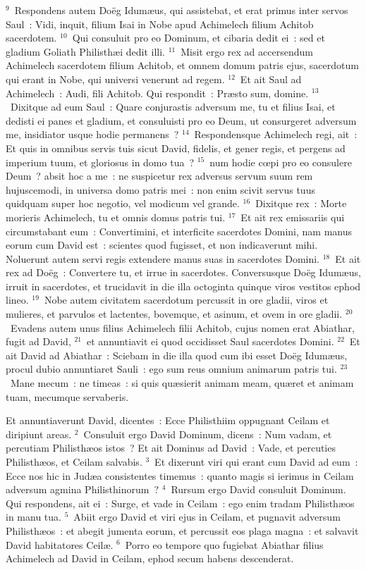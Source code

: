 ${}^{9}$~Respondens autem Do\"eg Idum\ae us, qui assistebat, et erat primus inter servos Saul~: Vidi, inquit, filium Isai in Nobe apud Achimelech filium Achitob sacerdotem.
${}^{10}$~Qui consuluit pro eo Dominum, et cibaria dedit ei~: sed et gladium Goliath Philisth\ae i dedit illi.
${}^{11}$~Misit ergo rex ad accersendum Achimelech sacerdotem filium Achitob, et omnem domum patris ejus, sacerdotum qui erant in Nobe, qui universi venerunt ad regem.
${}^{12}$~Et ait Saul ad Achimelech~: Audi, fili Achitob. Qui respondit~: Pr\ae sto sum, domine.
${}^{13}$~Dixitque ad eum Saul~: Quare conjurastis adversum me, tu et filius Isai, et dedisti ei panes et gladium, et consuluisti pro eo Deum, ut consurgeret adversum me, insidiator usque hodie permanens~?
${}^{14}$~Respondensque Achimelech regi, ait~: Et quis in omnibus servis tuis sicut David, fidelis, et gener regis, et pergens ad imperium tuum, et gloriosus in domo tua~?
${}^{15}$~num hodie cœpi pro eo consulere Deum~? absit hoc a me~: ne suspicetur rex adversus servum suum rem hujuscemodi, in universa domo patris mei~: non enim scivit servus tuus quidquam super hoc negotio, vel modicum vel grande.
${}^{16}$~Dixitque rex~: Morte morieris Achimelech, tu et omnis domus patris tui.
${}^{17}$~Et ait rex emissariis qui circumstabant eum~: Convertimini, et interficite sacerdotes Domini, nam manus eorum cum David est~: scientes quod fugisset, et non indicaverunt mihi. Noluerunt autem servi regis extendere manus suas in sacerdotes Domini.
${}^{18}$~Et ait rex ad Do\"eg~: Convertere tu, et irrue in sacerdotes. Conversusque Do\"eg Idum\ae us, irruit in sacerdotes, et trucidavit in die illa octoginta quinque viros vestitos ephod lineo.
${}^{19}$~Nobe autem civitatem sacerdotum percussit in ore gladii, viros et mulieres, et parvulos et lactentes, bovemque, et asinum, et ovem in ore gladii.
${}^{20}$~Evadens autem unus filius Achimelech filii Achitob, cujus nomen erat Abiathar, fugit ad David,
${}^{21}$~et annuntiavit ei quod occidisset Saul sacerdotes Domini.
${}^{22}$~Et ait David ad Abiathar~: Sciebam in die illa quod cum ibi esset Do\"eg Idum\ae us, procul dubio annuntiaret Sauli~: ego sum reus omnium animarum patris tui.
${}^{23}$~Mane mecum~: ne timeas~: si quis qu\ae sierit animam meam, qu\ae ret et animam tuam, mecumque servaberis.

\lettrine[lines=10,image=true,loversize=0.05,lraise=-0.03]{E}{}t annuntiaverunt David, dicentes~: Ecce Philisthiim oppugnant Ceilam et diripiunt areas.
${}^{2}$~Consuluit ergo David Dominum, dicens~: Num vadam, et percutiam Philisth\ae os istos~? Et ait Dominus ad David~: Vade, et percuties Philisth\ae os, et Ceilam salvabis.
${}^{3}$~Et dixerunt viri qui erant cum David ad eum~: Ecce nos hic in Jud\ae a consistentes timemus~: quanto magis si ierimus in Ceilam adversum agmina Philisthinorum~?
${}^{4}$~Rursum ergo David consuluit Dominum. Qui respondens, ait ei~: Surge, et vade in Ceilam~: ego enim tradam Philisth\ae os in manu tua.
${}^{5}$~Abiit ergo David et viri ejus in Ceilam, et pugnavit adversum Philisth\ae os~: et abegit jumenta eorum, et percussit eos plaga magna~: et salvavit David habitatores Ceil\ae .
${}^{6}$~Porro eo tempore quo fugiebat Abiathar filius Achimelech ad David in Ceilam, ephod secum habens descenderat.


